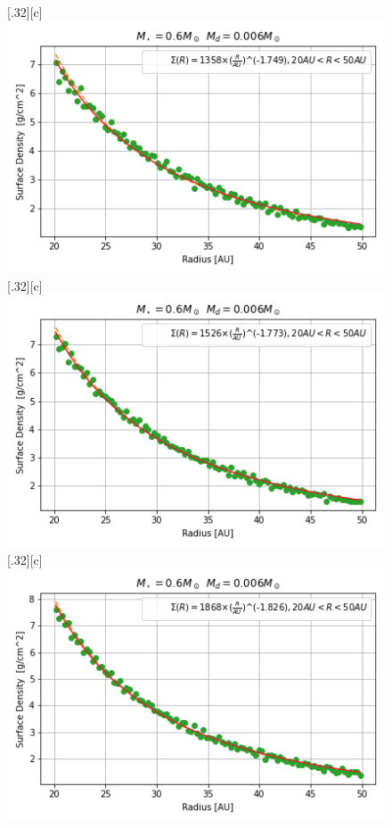 \documentclass[aps,prb,twocolumn,superscriptaddress,floatfix,longbibliography]{revtex4-2}
\begin{document}
\begin{appendices}
\begin{figure}[!htbp]\vspace*{4cm}
  \centering
  \subcaptionbox*{}[.32\linewidth][c]{%
    \includegraphics[width=\linewidth]{Graphs_1D/r_0.6s_0.006d_0.3q_1D.png}}\quad
  \subcaptionbox*{}[.32\linewidth][c]{%
    \includegraphics[width=\linewidth]{Graphs_1D/r_0.6s_0.006d_0.5q_1D.png}}\quad
  \subcaptionbox*{}[.32\linewidth][c]{%
    \includegraphics[width=\linewidth]{Graphs_1D/r_0.6s_0.006d_0.7q_1D.png}}\quad

\end{figure}
\end{appendices}
\end{document}
